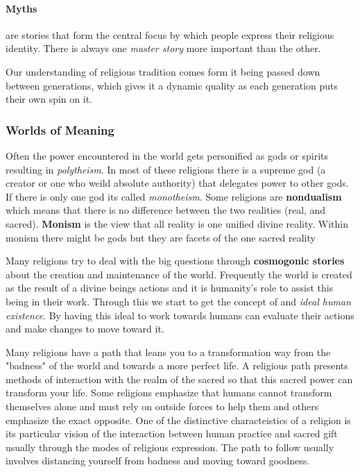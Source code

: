 \documentclass{article}
\begin{document}
\paragraph{Myths}
\label{par:myths}
are stories that form the central focus by which people express their religious identity. There is always one \emph{master story} more important than the other.

Our understanding of religious tradition comes form it being passed down between generations, which gives it a dynamic quality as each generation puts their own spin on it.

\subsubsection{Worlds of Meaning}
\label{ssub:worlds_of_meaning}
Often the power encountered in the world gets personified as gods or spirits resulting in \emph{polytheism}. In most of these religions there is a supreme god (a creator or one who weild absolute authority) that delegates power to other gods. If there is only one god its called \emph{monotheism}. Some religions are \textbf{nondualism} which means that there is no difference between the two realities (real, and sacred). \textbf{Monism} is the view that all reality is one unified divine reality. Within monism there might be gods but they are facets of the one sacred reality

Many religions try to deal with the big questions through \textbf{cosmogonic stories} about the creation and maintenance of the world. Frequently the world is created as the result of a divine beings actions and it is humanity's role to assist this being in their work. Through this we start to get the concept of and \emph{ideal human existence}. By having this ideal to work towards humans can evaluate their actions and make changes to move toward it.

Many religions have a path that leans you to a transformation way from the "badness" of the world and towards a more perfect life. A religious path presents methods of interaction with the realm of the sacred so that this sacred power can transform your life. Some religions emphasize that humans cannot transform themselves alone and must rely on outside forces to help them and others emphasize the exact opposite. One of the distinctive characteistics of a religion is its particular vision of the interaction between human practice and sacred gift usually through the modes of religious expression. The path to follow usually involves distancing yourself from badness and moving toward goodness.
\end{document}
